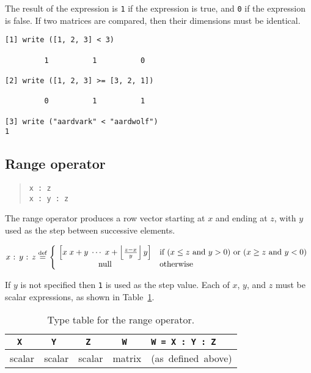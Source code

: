 The result of the expression is {\tt 1} if the expression is true, and
{\tt 0} if the expression is false.  If two matrices are compared,
then their dimensions must be identical.

\begin{screen}
\begin{verbatim}
[1] write ([1, 2, 3] < 3)

         1          1          0 

[2] write ([1, 2, 3] >= [3, 2, 1])

         0          1          1 

[3] write ("aardvark" < "aardwolf")
1
\end{verbatim}
\end{screen}


\subsection{Range operator}
\label{burlap.op.range}

\begin{quote}
\begin{verbatim}
x : z
x : y : z
\end{verbatim}
\end{quote}

The range operator produces a row vector starting at $x$ and ending at
$z$, with $y$ used as the step between successive elements.

\begin{displaymath}
x \mbox{ : } y \mbox{ : } z \stackrel{\rm def}{=} \left\{
\begin{array}{cl}
\!\left[ x \; x + y \;\cdots\; x + \left\lfloor \frac{z - x}{y}
\right\rfloor y \right] &
\mbox{if ($x \leq z$ and $y > 0$) or ($x \geq z$ and $y < 0$)} \\
\!\mbox{null} & \mbox{otherwise}
\end{array} \right.
\end{displaymath}

If $y$ is not specified then {\tt 1} is used as the step value.  Each
of $x$, $y$, and $z$ must be scalar expressions, as shown in
Table~\ref{burlap.range.types}.

\begin{table}[htbp]
\begin{center}
\begin{tabular}{c|c|c|c|l}
\tt X  & \tt Y	& \tt Z	 & \tt W  & \tt W = X : Y : Z	      \\
\hline
scalar & scalar & scalar & matrix & \mbox{(as defined above)} \\
\end{tabular}
\caption{Type table for the range operator.}
\label{burlap.range.types}
\end{center}
\end{table}


